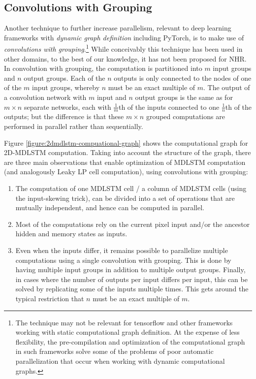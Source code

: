 \documentclass[conference]{IEEEtran}
\renewcommand{\ac}[1]{\gls{#1}}
\begin{document}
\subsection{Convolutions with Grouping}

Another technique to further increase parallelism, 
relevant to deep learning frameworks with \emph{dynamic graph definition} including PyTorch, 
is to make use of \emph{convolutions with grouping}.\footnote{The technique may not be relevant for tensorflow and other frameworks working with static computational graph definition. At the expense of less flexibility, the pre-compilation and optimization of the computational graph in such frameworks solve some of
the problems of poor automatic parallelization that occur when working with dynamic computational graphs.}
While conceivably this technique has been used in other domains, to the best of our knowledge, it has not been proposed for \ac{NHR}.
In convolution with grouping, the computation is partitioned into $m$ input groups and $n$ 
output groups. Each of the $n$ outputs is only connected to the nodes of one of the $m$ input groups, whereby $n$ must be an exact multiple of $m$.
The output of a convolution network with $m$ input and $n$ output groups is the same as for $m \times n$ separate networks, each with $\frac{1}{m}$th of the inputs connected to one $\frac{1}{n}$th of the outputs; but the difference is that these $m \times n$ grouped computations are performed in parallel rather than sequentially.

Figure \ref{figure:2dmdlstm-compuational-graph} shows the computational graph for 2D-\ac{MDLSTM} computation. 
Taking into account the structure of the graph, there are three main observations that enable 
optimization of \ac{MDLSTM} computation (and analogously Leaky LP cell computation), using convolutions with grouping: 
\begin{enumerate}
\item The computation of one MDLSTM cell / a column of MDLSTM cells (using the input-skewing trick), can be divided into 
a set of operations that are mutually independent, and hence can be computed in parallel. 
\item Most of the computations rely on the current pixel input and/or the ancestor hidden and memory states as inputs. 
\item Even when the inputs differ, it remains possible to parallelize multiple computations using a single convolution with grouping.
This is done by having multiple input groups in addition to multiple output groups.
Finally, in cases where the number of outputs per input differs per input, 
this can be solved by replicating some of the inputs multiple times. This gets around the typical restriction that $n$ must 
be an exact multiple of $m$. 
\end{enumerate}
\end{document}
